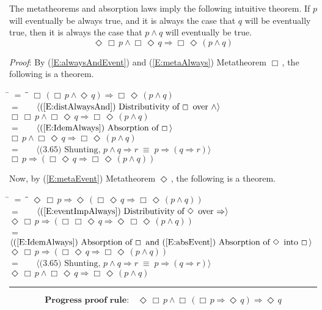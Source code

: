\documentclass[12pt, fleqn, leqno]{article}
\newcommand{\lgap}{2pt}                             %
\newcommand{\mymathindent}{24pt}                    %
\newcommand{\equivs}{\ensuremath{\;\equiv\;}}       %
\newcommand{\impl}{\ensuremath{\Rightarrow}}        %
\newcommand{\Event}{\Diamond\,}
\newcommand{\Always}{\Box\,}
\newcommand{\myqed}{\rule[-.23ex]{1.2ex}{2.0ex}}
\newcommand{\myqedtab}{\hspace{384pt}}              %
\newcommand{\Gll} {\langle}                         %
\newcommand{\Ggg} {\rangle}                         %
\newcommand{\Hint}[1]     {\ \ \ $\Gll              \mbox{#1} \Ggg$ }   %
\begin{document}
The metatheorems and absorption laws imply the following intuitive theorem.
If $p$ will eventually be always true, and it is always the case that $q$ will be eventually true, then it is always the case that $p\land q$ will eventually be true.
\begin{equation}\label{E:eventAlwaysPAndAlwaysEventQ}
\Event\Always p\land \Always\Event q \impl \Always\Event (p\land q)
\end{equation}

\emph{Proof}: By (\ref{E:alwaysAndEvent}) and (\ref{E:metaAlways}) Metatheorem $\Always$, the following is a theorem.
\begin{tabbing}
\hspace{\mymathindent} \= $= \;$ \= \myqedtab \= \kill
\> \>   $\Always (\Always p \land \Event q) \impl \Always\Event (p \land q)$\\[\lgap]
\> $=$  \>  \Hint{(\ref{E:distAlwaysAnd}) Distributivity of $\Always$ over $\land$}\\[\lgap]
\> \>   $\Always \Always p \land \Always\Event q \impl \Always\Event (p \land q)$\\[\lgap]
\> $=$  \>  \Hint{(\ref{E:IdemAlways}) Absorption of $\Always$}\\[\lgap]
\> \>   $\Always p \land \Always\Event q \impl \Always\Event (p \land q)$\\[\lgap]
\> $=$  \>  \Hint{(3.65) Shunting, $p\land q\impl r\equivs p\impl (q\impl r)$}\\[\lgap]
\> \>   $\Always p \impl (\Always\Event q \impl \Always\Event (p \land q))$
\end{tabbing}
Now, by (\ref{E:metaEvent}) Metatheorem $\Event$, the following is a theorem.
\begin{tabbing}
\hspace{\mymathindent} \= $= \;$ \= \myqedtab \= \kill
\> \>   $\Event\Always p \impl \Event(\Always\Event q \impl \Always\Event (p \land q))$\\[\lgap]
\> $=$  \>  \Hint{(\ref{E:eventImpAlways}) Distributivity of $\Event$ over $\impl$}\\[\lgap]
\> \>   $\Event\Always p \impl (\Always\Always\Event q \impl \Event\Always\Event (p \land q))$\\[\lgap]
\> $=$  \>  \Hint{(\ref{E:IdemAlways}) Absorption of $\Always$ and (\ref{E:absEvent}) Absorption of $\Event$ into $\Always$}\\[\lgap]
\> \>   $\Event\Always p \impl (\Always\Event q \impl \Always\Event (p \land q))$\\[\lgap]
\> $=$  \>  \Hint{(3.65) Shunting, $p\land q\impl r\equivs p\impl (q\impl r)$}\\[\lgap]
\> \>   $\Event\Always p\land \Always\Event q \impl \Always\Event (p\land q)$ \quad \myqed
\end{tabbing}
\begin{equation}\label{E:PrProofRule}
\textbf{Progress proof rule:}\quad \Event\Always p \land \Always(\Always p \impl \Event q) \impl \Event q
\end{equation}
\end{document}
